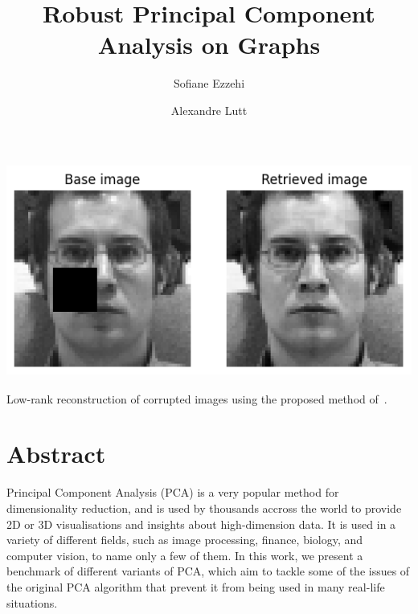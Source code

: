 \documentclass[sigconf]{acmart}
\begin{document}
\title{Robust Principal Component Analysis on Graphs}

\author{Sofiane Ezzehi}

\author{Alexandre Lutt}

\begin{teaserfigure}
  \center
  \includegraphics[width=15cm, height=7cm]{sampleteaser}
  \caption{Low-rank reconstruction of corrupted images using the proposed method of~\cite{main_paper}.}
  \label{fig:teaser}
\end{teaserfigure}

\maketitle
\pagestyle{plain}

\section{Abstract}

Principal Component Analysis (PCA) is a very popular method for dimensionality reduction, and is used by thousands accross the world to provide 2D or 3D visualisations and insights about high-dimension data. It is used in a variety of different fields, such as image processing, finance, biology, and computer vision, to name only a few of them.
In this work, we present a benchmark of different variants of PCA, which aim to tackle some of the issues of the original PCA algorithm that prevent it from being used in many real-life situations. 
\end{document}
